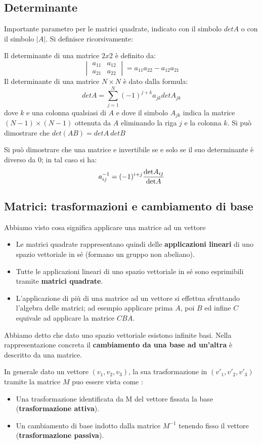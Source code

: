 \documentclass[a4paper, 10pt]{article}
\begin{document}
	\subsection{Determinante}
		Importante parametro per le matrici quadrate, indicato con il
		simbolo $ det A $ o con il simbolo $ |A| $. Si definisce
		ricorsivamente:
		
		Il determinante di una matrice $ 2x2 $ è definito da:
		\[
			\begin{vmatrix}
				a_{1 1} & a_{1 2} \\
				a_{2 1} & a_{2 2}
			\end{vmatrix}
			= a_{1 1}a_{2 2} - a_{1 2}a_{2 1}
		\]
		Il determinante di una matrice $ N\times N $ è dato dalla formula:
		\[
			detA = \sum_{j = 1}^{N} (-1)^{j + k} a_{j k} detA_{j k}
		\]
		dove $ k $ e una colonna qualsiasi di $ A $ e dove il simbolo $ A_{j k} $ indica
		la matrice $ (N-1)\times(N-1) $ ottenuta da $ A $ eliminando la riga $ j $ e la
		colonna $ k $. Si può dimostrare che $ det(AB) = detA\: detB $
		
		\noindent
		Si può dimostrare che una matrice e invertibile se e solo se il suo
		determinante è diverso da 0; in tal caso si ha:
		\[
			a_{i j}^{-1} = (-1)^{i+j} \dfrac{\textup{det}A_{i j}}{\textup{det}A}
		\]
	\subsection{Matrici: trasformazioni e cambiamento di base}
		Abbiamo visto cosa significa applicare una matrice ad un vettore
		\begin{itemize}
			\item Le matrici quadrate rappresentano quindi delle\textbf{ applicazioni
			lineari} di uno spazio vettoriale in sé (formano un gruppo non
			abeliano).
			\item Tutte le applicazioni lineari di uno spazio vettoriale in sé sono
			esprimibili tramite \textbf{matrici quadrate}.
			\item L'applicazione di più di una matrice ad un vettore si effettua
			sfruttando l'algebra delle matrici; ad esempio applicare prima
			$ A $, poi $ B $ ed infine $ C $ equivale ad applicare la matrice $ CBA $.
		\end{itemize}
		Abbiamo detto che dato uno spazio vettoriale esistono infinite
		basi. Nella rappresentazione concreta il \textbf{cambiamento da una
		base ad un'altra} è descritto da una matrice.
	
		\noindent
		In generale dato un vettore $ (v_1 , v_2 , v_3 ) $, la sua trasformazione
		in $ (v'_1 , v'_2 , v'_3 ) $ tramite la matrice $ M $ puo essere vista come :
		\begin{itemize}
			\item Una trasformazione identificata da M del vettore fissata la base (\textbf{trasformazione attiva}).
			\item Un cambiamento di base indotto dalla matrice $ M^{-1} $ tenendo fisso il vettore (\textbf{trasformazione passiva}).
		\end{itemize}
		
\end{document}
